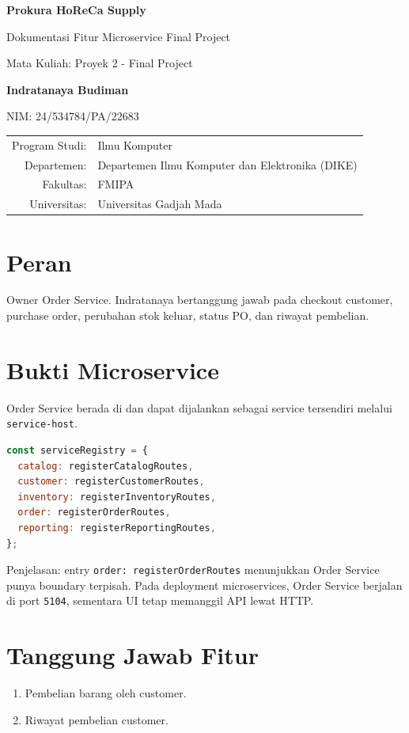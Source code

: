 \documentclass[11pt,a4paper]{article}
\newcommand{\docheader}[2]{
\begin{titlepage}
\centering
{\Large\bfseries Prokura HoReCa Supply\par}
\vspace{0.4cm}
{\large Dokumentasi Fitur Microservice Final Project\par}
\vspace{0.8cm}
{\large Mata Kuliah: Proyek 2 - Final Project\par}
\vspace{1.2cm}
{\large\bfseries #1\par}
{\large NIM: #2\par}
\vfill
\begin{tabular}{rl}
Program Studi: & Ilmu Komputer\\
Departemen: & Departemen Ilmu Komputer dan Elektronika (DIKE)\\
Fakultas: & FMIPA\\
Universitas: & Universitas Gadjah Mada\\
\end{tabular}
\vfill
\end{titlepage}
}
\begin{document}
\docheader{Indratanaya Budiman}{24/534784/PA/22683}

\section*{Peran}
Owner Order Service. Indratanaya bertanggung jawab pada checkout customer, purchase order, perubahan stok keluar, status PO, dan riwayat pembelian.

\section*{Bukti Microservice}
Order Service berada di  dan dapat dijalankan sebagai service tersendiri melalui \texttt{service-host}.

\begin{lstlisting}[language=JavaScript]
const serviceRegistry = {
  catalog: registerCatalogRoutes,
  customer: registerCustomerRoutes,
  inventory: registerInventoryRoutes,
  order: registerOrderRoutes,
  reporting: registerReportingRoutes,
};
\end{lstlisting}

Penjelasan: entry \texttt{order: registerOrderRoutes} menunjukkan Order Service punya boundary terpisah. Pada deployment microservices, Order Service berjalan di port \texttt{5104}, sementara UI tetap memanggil API lewat HTTP.

\section*{Tanggung Jawab Fitur}
\begin{enumerate}
\item Pembelian barang oleh customer.
\item Riwayat pembelian customer.
\end{enumerate}
\end{document}

